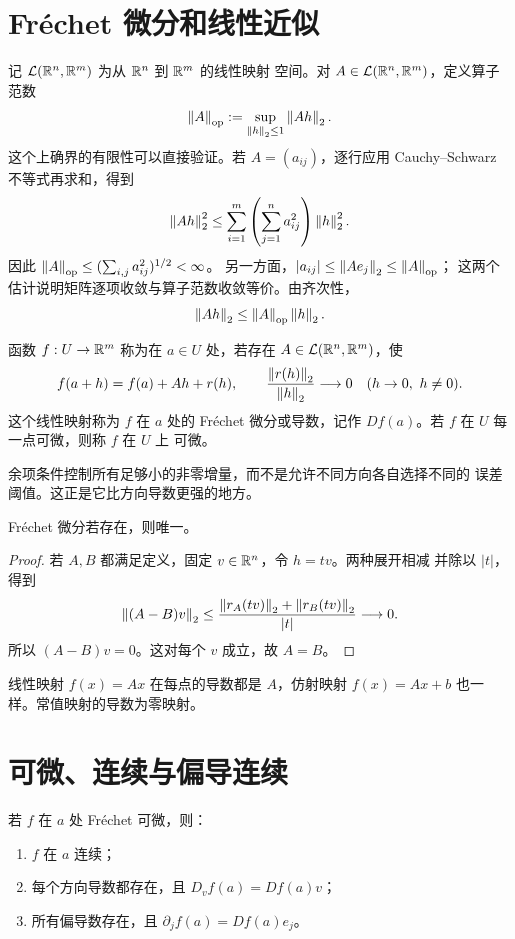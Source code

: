 \section{Fréchet 微分和线性近似}

记 \(\mathcal L(\mathbb{R}^n,\mathbb{R}^m)\) 为从 \(\mathbb{R}^n\) 到 \(\mathbb{R}^m\) 的线性映射
空间。对 \(A\in\mathcal L(\mathbb{R}^n,\mathbb{R}^m)\)，定义算子范数
\[
 \left\lVert A\right\rVert_{\mathrm{op}}
 :=\sup_{\left\lVert h\right\rVert_2\le1}\left\lVert Ah\right\rVert_2.
\]
这个上确界的有限性可以直接验证。若 \(A=(a_{ij})\)，逐行应用
Cauchy--Schwarz 不等式再求和，得到
\[
 \left\lVert Ah\right\rVert_2^2
 \le\sum_{i=1}^m\left(\sum_{j=1}^n a_{ij}^2\right)\left\lVert h\right\rVert_2^2.
\]
因此 \(\left\lVert A\right\rVert_{\mathrm{op}}\le(\sum_{i,j}a_{ij}^2)^{1/2}<\infty\)。
另一方面，\(|a_{ij}|\le\left\lVert Ae_j\right\rVert_2\le\left\lVert A\right\rVert_{\mathrm{op}}\)；
这两个估计说明矩阵逐项收敛与算子范数收敛等价。由齐次性，
\[
 \left\lVert Ah\right\rVert_2\le\left\lVert A\right\rVert_{\mathrm{op}}\left\lVert h\right\rVert_2.
\]

\begin{definition}[Fréchet 可微]
函数 \(f:U\to\mathbb{R}^m\) 称为在 \(a\in U\) 处，若存在
\(A\in\mathcal L(\mathbb{R}^n,\mathbb{R}^m)\)，使
\[
 f(a+h)=f(a)+Ah+r(h),
 \qquad
 \frac{\left\lVert r(h)\right\rVert_2}{\left\lVert h\right\rVert_2}\longrightarrow0
 \quad(h\to0,\ h\ne0).
\]
这个线性映射称为 \(f\) 在 \(a\) 处的 Fréchet 微分或导数，记作
\(Df(a)\)。若 \(f\) 在 \(U\) 每一点可微，则称 \(f\) 在 \(U\) 上
可微。
\end{definition}

余项条件控制所有足够小的非零增量，而不是允许不同方向各自选择不同的
误差阈值。这正是它比方向导数更强的地方。

\begin{proposition}[线性主部的唯一性]
\label{prop:frechet-derivative-unique}
Fréchet 微分若存在，则唯一。
\end{proposition}

\begin{proof}
若 \(A,B\) 都满足定义，固定 \(v\in\mathbb{R}^n\)，令 \(h=tv\)。两种展开相减
并除以 \(|t|\)，得到
\[
 \left\lVert(A-B)v\right\rVert_2
 \le \frac{\left\lVert r_A(tv)\right\rVert_2+\left\lVert r_B(tv)\right\rVert_2}{|t|}
 \longrightarrow0.
\]
所以 \((A-B)v=0\)。这对每个 \(v\) 成立，故 \(A=B\)。
\end{proof}

线性映射 \(f(x)=Ax\) 在每点的导数都是 \(A\)，仿射映射
\(f(x)=Ax+b\) 也一样。常值映射的导数为零映射。

\section{可微、连续与偏导连续}

\begin{theorem}[可微性的直接后果]
\label{thm:frechet-implies-continuous-directional}
若 \(f\) 在 \(a\) 处 Fréchet 可微，则：
\begin{enumerate}[label=\textup{(\roman*)}]
 \item \(f\) 在 \(a\) 连续；
 \item 每个方向导数都存在，且
 \(D_vf(a)=Df(a)v\)；
 \item 所有偏导数存在，且
 \(\partial_jf(a)=Df(a)e_j\)。
\end{enumerate}
\end{theorem}

